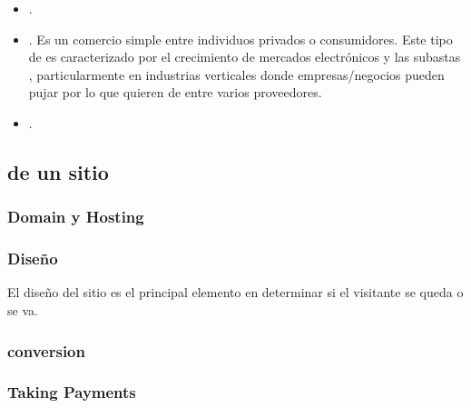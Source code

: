\begin{itemize}
	\item \textbf{\gtog}.

	\item \textbf{\ctoc}. Es un comercio simple entre individuos privados o consumidores. Este tipo de \ecommerce es caracterizado por el crecimiento de mercados electrónicos y las subastas \online, particularmente en industrias verticales donde empresas/negocios pueden pujar por lo que quieren de entre varios proveedores.

	\item \textbf{\mcommerce}.
	
\end{itemize}

\subsection{\keyelements de un sitio \ecommerce \cite{inbook_ecommerce_keyelements}}

\subsubsection{Domain y Hosting}
\subsubsection{Diseño}
El diseño del sitio es el principal elemento en determinar si el visitante se queda o se va.

\subsubsection{\usability}

\subsubsection{conversion}

\subsubsection{\checkout}

\subsubsection{Taking Payments}

